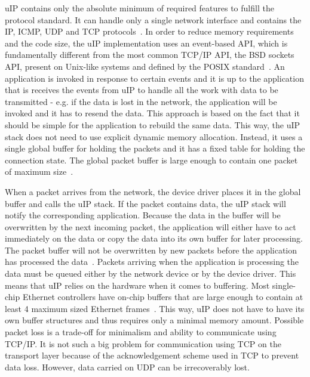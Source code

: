 uIP contains only the absolute minimum of required features to fulfill the protocol standard.
It can handle only a single network interface and contains the IP, ICMP, UDP and TCP protocols~\cite{contiki-docs}. %
In order to reduce memory requirements and the code size, %
the uIP implementation uses an event-based API, which is fundamentally different
from the most common TCP/IP API, the BSD sockets API, present on Unix-like systems
and defined by the POSIX standard~\cite{thesis-programming,posix}.
An application is invoked in response to certain events and
it is up to the application that is receives the events from uIP to handle all the
work with data to be transmitted - e.g. if the data is lost in the network, %
the application will be invoked and it has to resend the data. %
This approach is based on the fact that it should be simple for the application
to rebuild the same data.
This way, the uIP stack does not need to use explicit dynamic memory allocation.
Instead, it uses a single global buffer for holding the packets and it has a fixed
table for holding the connection state.
The global packet buffer is large enough to contain one packet of maximum size~\cite{contiki-docs}. %

When a packet arrives from the network, the device driver places it in the
global buffer and calls the uIP stack.
If the packet contains data, the uIP stack will notify the corresponding application. %
Because the data in the buffer will be overwritten by the next incoming packet, %
the application will either have to act immediately on the data or copy the data into %
its own buffer for later processing.
The packet buffer will not be overwritten by new packets before the application has processed the data~\cite{contiki-docs}. %
Packets arriving when the application is processing the data must be queued
either by the network device or by the device driver.
This means that uIP relies on the hardware when it comes to buffering.
Most single-chip Ethernet controllers have on-chip buffers
that are large enough to contain at least 4 maximum sized Ethernet frames~\cite{contiki-docs}. %
This way, uIP does not have to have its own buffer structures and thus requires only a minimal memory amount. %
Possible packet loss is a trade-off for minimalism and ability to communicate using TCP/IP. %
It is not such a big problem for communication using TCP on the transport layer
because of the acknowledgement scheme used in TCP to prevent data loss.
However, data carried on UDP can be irrecoverably lost.

